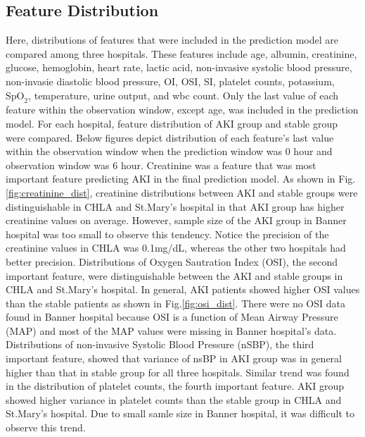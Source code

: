 \documentclass[
   technote
]{phildoc}
\newcommand{\fig}{Fig.}
\begin{document}
\subsection{Feature Distribution}
Here, distributions of features that were included in the prediction model are compared among three hospitals. These features include age, albumin, creatinine, glucose, hemoglobin, heart rate, lactic acid, non-invasive systolic blood pressure, non-invasie diastolic blood pressure, OI, OSI, SI, platelet counts, potassium, $\text{SpO}_2$, temperature, urine output, and wbc count. Only the last value of each feature within the observation window, except age, was included in the prediction model. For each hospital, feature distribution of AKI group and stable group were compared. Below figures depict distribution of each feature's last value within the observation window when the prediction window was 0 hour and observation window was 6 hour. Creatinine was a feature that was most important feature predicting AKI in the final prediction model. As shown in \fig \ref{fig:creatinine_dist}, creatinine distributions between AKI and stable groups were distinguishable in CHLA and St.Mary's hospital in that AKI group has higher creatinine values on average. However, sample size of the AKI group in Banner hospital was too small to observe this tendency. Notice the precision of the creatinine values in CHLA was 0.1mg/dL, whereas the other two hospitals had better precision. Distributions of Oxygen Sautration Index (OSI), the second important feature, were distinguishable between the AKI and stable groups in CHLA and St.Mary's hospital. In general, AKI patients showed higher OSI values than the stable patients as shown in \fig \ref{fig:osi_dist}. There were no OSI data found in Banner hospital because OSI is a function of Mean Airway Pressure (MAP) and most of the MAP values were missing in Banner hospital's data. Distributions of non-invasive Systolic Blood Pressure (nSBP), the third important feature, showed that variance of nsBP in AKI group was in general higher than that in stable group for all three hospitals. Similar trend was found in the distribution of platelet counts, the fourth important feature. AKI group showed higher variance in platelet counts than the stable group in CHLA and St.Mary's hospital. Due to small samle size in Banner hospital, it was difficult to observe this trend. 


\end{document}
